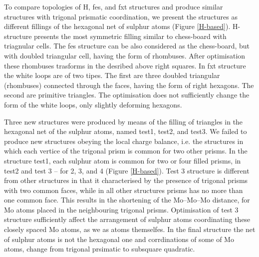 \documentclass[a4paperm]{article}
\begin{document}
To compare topologies of H, fes, and fxt structures and produce similar structures with trigonal prismatic coordination, we present the structures as different fillings of the hexagonal net of sulphur atoms (Figure \ref{H-based}).
H-structure presents the most symmetric filling similar to chess-board with triagnular cells.
The fes structure can be also considered as the chess-board, but with doubled triangular cell, having the form of rhombuses.
After optimisation these rhombuses trasforms in the desribed above right squares.
In fxt structure the white loops are of two tipes.
The first are three doubled triangular (rhombuses) connected through the faces, having the form of right hexagons.
The second are primitive triangles.
The optimisation does not sufficiently change the form of the white loops, only slightly deforming hexagons.


Three new structures were produced by means of the filling of triangles in the hexagonal net of the sulphur atoms, named test1, test2, and test3.
We failed to produce new structures obeying the local charge balance, i.e. the structures in which each vertice of the trigonal prism is common for two other prisms.
In the structure test1, each sulphur atom is common for two or four filled prisms, in test2 and test 3 – for 2, 3, and 4 (Figure \ref{H-based}).
Test 3 structure is different from other structures in that it characterised by the presence of trigonal prisms with two common faces, while in all other structures prisms has no more than one common face.
This results in the shortening of the Mo--Mo--Mo distance, for Mo atoms placed in the neighbouring trigonal prisms.
Optimisation of test 3 structure sufficiently affect the arrangement of sulphur atoms coordinating these closely spaced Mo atoms, as we as atoms themselfes.
In the final structure the net of sulphur atoms is not the hexagonal one and corrdinations of some of Mo atoms, change from trigonal prsimatic to subsquare quadratic.
\end{document}
